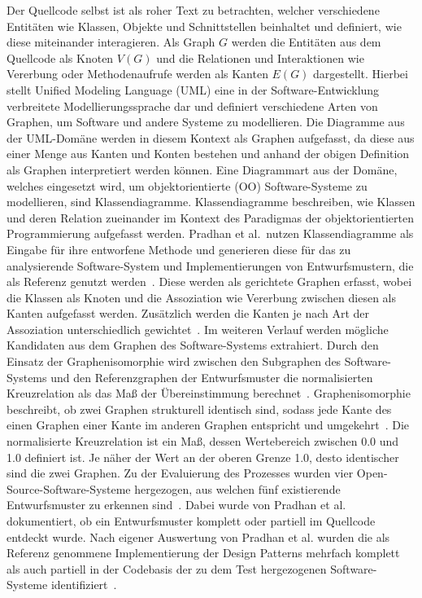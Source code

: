 Der Quellcode selbst ist als roher Text zu betrachten, welcher verschiedene Entitäten wie Klassen, Objekte und Schnittstellen beinhaltet und definiert, wie diese miteinander interagieren. Als Graph $G$ werden die Entitäten aus dem Quellcode als Knoten $V (G)$ und 
die Relationen und Interaktionen wie Vererbung oder Methodenaufrufe werden als Kanten $E (G)$ dargestellt.
Hierbei stellt Unified Modeling Language (UML) eine in der Software-Entwicklung verbreitete Modellierungssprache dar und definiert verschiedene Arten von Graphen, um Software und andere Systeme zu modellieren.
Die Diagramme aus der UML-Domäne werden in diesem Kontext als Graphen aufgefasst, da diese aus einer Menge aus Kanten und Konten bestehen und anhand der obigen Definition als Graphen interpretiert werden können.
Eine Diagrammart aus der Domäne, welches eingesetzt wird, um objektorientierte (OO) Software-Systeme zu modellieren, sind Klassendiagramme.
Klassendiagramme beschreiben, wie Klassen und deren Relation zueinander im Kontext des Paradigmas der objektorientierten Programmierung aufgefasst werden.
Pradhan et al.\ nutzen Klassendiagramme als Eingabe für ihre entworfene Methode und generieren diese für das zu analysierende Software-System und Implementierungen von Entwurfsmustern, die als Referenz genutzt werden~\cite[S. 2]{7346680}.
Diese werden als gerichtete Graphen erfasst, wobei die Klassen als Knoten und die Assoziation wie Vererbung zwischen diesen als Kanten aufgefasst werden. Zusätzlich werden die Kanten je nach Art der Assoziation unterschiedlich gewichtet~\cite[S. 2]{7346680}.
Im weiteren Verlauf werden mögliche Kandidaten aus dem Graphen des Software-Systems extrahiert. Durch den Einsatz der Graphenisomorphie wird zwischen den Subgraphen des Software-Systems und den Referenzgraphen der Entwurfsmuster die normalisierten Kreuzrelation als das Maß der Übereinstimmung berechnet~\cite[S. 3]{7346680}.
Graphenisomorphie beschreibt, ob zwei Graphen strukturell identisch sind, sodass jede Kante des einen Graphen einer Kante im anderen Graphen entspricht und umgekehrt~\cite[S. 10]{Siu1998IntroductionTG}. Die normalisierte Kreuzrelation ist ein Maß, dessen Wertebereich zwischen 0.0 und 1.0 definiert ist.
Je näher der Wert an der oberen Grenze 1.0, desto identischer sind die zwei Graphen. 
Zu der Evaluierung des Prozesses wurden vier Open-Source-Software-Systeme hergezogen, aus welchen fünf existierende Entwurfsmuster zu erkennen sind~\cite[S. 6]{7346680}. Dabei wurde von Pradhan et al. dokumentiert, ob ein Entwurfsmuster komplett oder partiell im Quellcode entdeckt wurde.
Nach eigener Auswertung von Pradhan et al. wurden die als Referenz genommene Implementierung der Design Patterns mehrfach komplett als auch partiell in der Codebasis der zu dem Test hergezogenen Software-Systeme identifiziert~\cite[S. 6]{7346680}.

